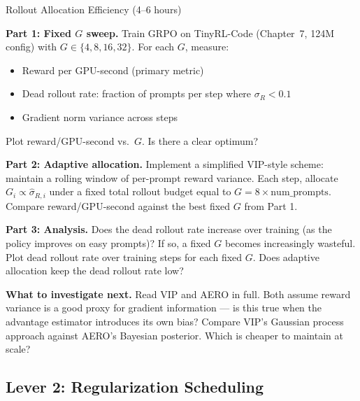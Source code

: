 \begin{exercise}{Rollout Allocation Efficiency (4--6 hours)}

\textbf{Part 1: Fixed $G$ sweep.} Train GRPO on TinyRL-Code (Chapter~7, 124M config) with $G \in \{4, 8, 16, 32\}$. For each $G$, measure:
\begin{itemize}
  \item Reward per GPU-second (primary metric)
  \item Dead rollout rate: fraction of prompts per step where $\sigma_R < 0.1$
  \item Gradient norm variance across steps
\end{itemize}
Plot reward/GPU-second vs.\ $G$. Is there a clear optimum?

\textbf{Part 2: Adaptive allocation.} Implement a simplified VIP-style scheme: maintain a rolling window of per-prompt reward variance. Each step, allocate $G_i \propto \hat{\sigma}_{R,i}$ under a fixed total rollout budget equal to $G = 8 \times \text{num\_prompts}$. Compare reward/GPU-second against the best fixed $G$ from Part 1.

\textbf{Part 3: Analysis.} Does the dead rollout rate increase over training (as the policy improves on easy prompts)? If so, a fixed $G$ becomes increasingly wasteful. Plot dead rollout rate over training steps for each fixed $G$. Does adaptive allocation keep the dead rollout rate low?

\textbf{What to investigate next.} Read VIP and AERO in full. Both assume reward variance is a good proxy for gradient information --- is this true when the advantage estimator introduces its own bias? Compare VIP's Gaussian process approach against AERO's Bayesian posterior. Which is cheaper to maintain at scale?
\end{exercise}

\subsection{Lever 2: Regularization Scheduling}

